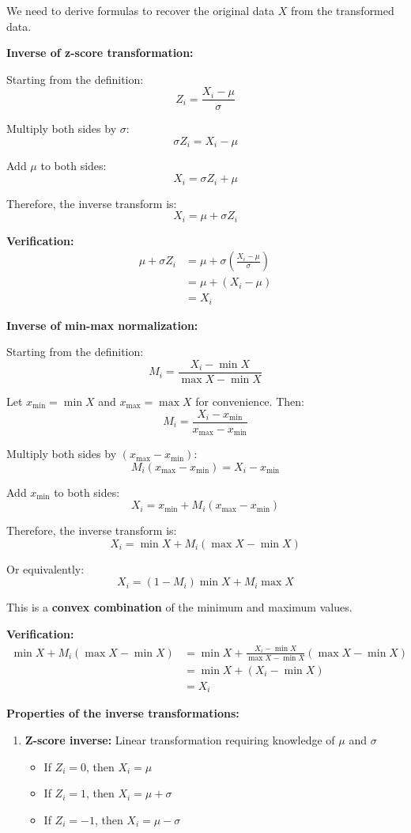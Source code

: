 \documentclass[12pt]{article}
\begin{document}
\begin{solution}
We need to derive formulas to recover the original data \(X\) from the transformed data.

\textbf{Inverse of z-score transformation:}

Starting from the definition:
\[
Z_i = \frac{X_i - \mu}{\sigma}
\]

Multiply both sides by \(\sigma\):
\[
\sigma Z_i = X_i - \mu
\]

Add \(\mu\) to both sides:
\[
X_i = \sigma Z_i + \mu
\]

Therefore, the inverse transform is:
\[
\boxed{X_i = \mu + \sigma Z_i}
\]

\textbf{Verification:}
\begin{align*}
\mu + \sigma Z_i &= \mu + \sigma \left(\frac{X_i - \mu}{\sigma}\right) \\
&= \mu + (X_i - \mu) \\
&= X_i
\end{align*}

\textbf{Inverse of min-max normalization:}

Starting from the definition:
\[
M_i = \frac{X_i - \min X}{\max X - \min X}
\]

Let \(x_{\min} = \min X\) and \(x_{\max} = \max X\) for convenience. Then:
\[
M_i = \frac{X_i - x_{\min}}{x_{\max} - x_{\min}}
\]

Multiply both sides by \((x_{\max} - x_{\min})\):
\[
M_i(x_{\max} - x_{\min}) = X_i - x_{\min}
\]

Add \(x_{\min}\) to both sides:
\[
X_i = x_{\min} + M_i(x_{\max} - x_{\min})
\]

Therefore, the inverse transform is:
\[
\boxed{X_i = \min X + M_i(\max X - \min X)}
\]

Or equivalently:
\[
\boxed{X_i = (1 - M_i)\min X + M_i \max X}
\]

This is a \textbf{convex combination} of the minimum and maximum values.

\textbf{Verification:}
\begin{align*}
\min X + M_i(\max X - \min X) &= \min X + \frac{X_i - \min X}{\max X - \min X}(\max X - \min X) \\
&= \min X + (X_i - \min X) \\
&= X_i
\end{align*}

\textbf{Properties of the inverse transformations:}

\begin{enumerate}
    \item \textbf{Z-score inverse:} Linear transformation requiring knowledge of \(\mu\) and \(\sigma\)
    \begin{itemize}
        \item If \(Z_i = 0\), then \(X_i = \mu\)
        \item If \(Z_i = 1\), then \(X_i = \mu + \sigma\)
        \item If \(Z_i = -1\), then \(X_i = \mu - \sigma\)
    \end{itemize}


\end{enumerate}
\end{solution}
\end{document}
